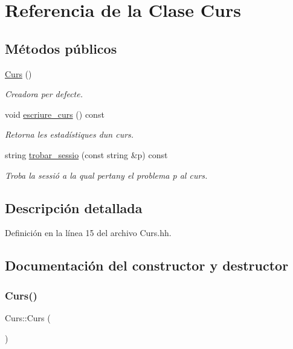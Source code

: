 \hypertarget{class_curs}{}\section{Referencia de la Clase Curs}
\label{class_curs}
\subsection*{Métodos públicos}
\begin{DoxyCompactItemize}
\item 
\mbox{\hyperlink{class_curs_acecd9c67882f6d09fc15fb822420e245}{Curs}} ()
\begin{DoxyCompactList}\small\item\em Creadora per defecte. \end{DoxyCompactList}\item 
void \mbox{\hyperlink{class_curs_a54b500f472e5ae51395bca6fe1e0bd09}{escriure\+\_\+curs}} () const
\begin{DoxyCompactList}\small\item\em Retorna les estadístiques d\textquotesingle{}un curs. \end{DoxyCompactList}\item 
string \mbox{\hyperlink{class_curs_a6895416e7e0455a21d2389d050a0cfe0}{trobar\+\_\+sessio}} (const string \&p) const
\begin{DoxyCompactList}\small\item\em Troba la sessió a la qual pertany el problema {\itshape p} al curs. \end{DoxyCompactList}\end{DoxyCompactItemize}


\subsection{Descripción detallada}


Definición en la línea 15 del archivo Curs.\+hh.



\subsection{Documentación del constructor y destructor}
\mbox{\label{class_curs_acecd9c67882f6d09fc15fb822420e245}} 
\subsubsection{\texorpdfstring{Curs()}{Curs()}}
{\footnotesize\ttfamily Curs\+::\+Curs (\begin{DoxyParamCaption}{ }\end{DoxyParamCaption})}



